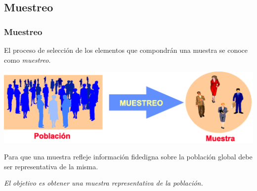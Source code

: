 \subsection{Muestreo}
\begin{frame}
\frametitle{Muestreo}
\begin{definicion}[Muestreo]
El proceso de selección de los elementos que compondrán una muestra se conoce como \emph{muestreo}.
\end{definicion}
\begin{center}
\includegraphics[scale=0.5]{img/introduccion/muestreo}
\end{center}
Para que una muestra refleje información fidedigna sobre la población global debe ser representativa de la misma.

\begin{center}
\alert{\emph{El objetivo es obtener una muestra representativa de la población.}}
\end{center}
\end{frame}



